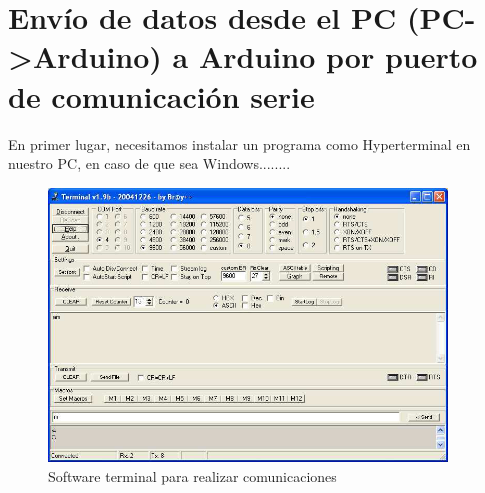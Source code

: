 \chapter{Envío de datos desde el PC (PC->Arduino) a Arduino por puerto de comunicación serie}

En primer lugar, necesitamos instalar un programa como Hyperterminal en nuestro PC, en caso de que sea Windows........
\begin{figure}[!htp]
	\centering
	\includegraphics[width=300pt]{./Imagenes/Documentos/ArduinoNotebook_img14.png}
	\caption[Hyperterminal]{Software terminal para realizar comunicaciones}
\end{figure}


